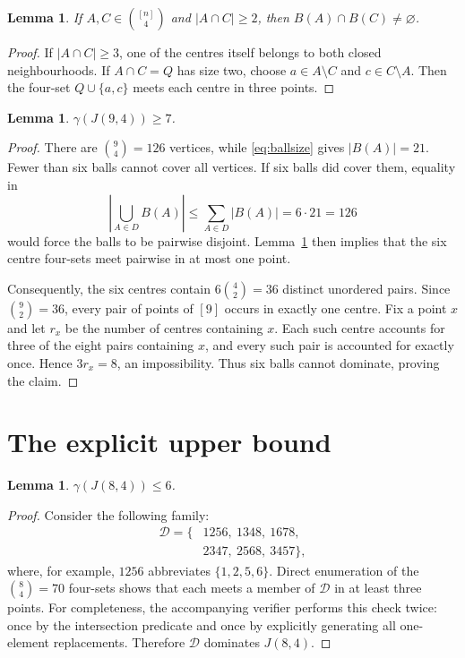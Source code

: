 \documentclass[11pt]{amsart}
\newtheorem{lemma}[theorem]{Lemma}
\begin{document}
\begin{lemma}\label{lem:intersection}
If $A,C\in\binom{[n]}4$ and $|A\cap C|\ge2$, then
$B(A)\cap B(C)\ne\varnothing$.
\end{lemma}
\begin{proof}
If $|A\cap C|\ge3$, one of the centres itself belongs to both closed
neighbourhoods.  If $A\cap C=Q$ has size two, choose
$a\in A\setminus C$ and $c\in C\setminus A$.  Then the four-set
$Q\cup\{a,c\}$ meets each centre in three points.
\end{proof}

\begin{lemma}\label{lem:lower}
$\gamma(J(9,4))\ge7$.
\end{lemma}
\begin{proof}
There are $\binom94=126$ vertices, while \eqref{eq:ballsize} gives
$|B(A)|=21$.  Fewer than six balls cannot cover all vertices.  If six balls
did cover them, equality in
\[
 \left|\bigcup_{A\in D}B(A)\right|\le\sum_{A\in D}|B(A)|=6\cdot21=126
\]
would force the balls to be pairwise disjoint.  Lemma~\ref{lem:intersection}
then implies that the six centre four-sets meet pairwise in at most one point.

Consequently, the six centres contain $6\binom42=36$ distinct unordered
pairs.  Since $\binom92=36$, every pair of points of $[9]$ occurs in exactly
one centre.  Fix a point $x$ and let $r_x$ be the number of centres containing
$x$.  Each such centre accounts for three of the eight pairs containing $x$,
and every such pair is accounted for exactly once.  Hence $3r_x=8$, an
impossibility.  Thus six balls cannot dominate, proving the claim.
\end{proof}

\section{The explicit upper bound}
\begin{lemma}\label{lem:upper}
$\gamma(J(8,4))\le6$.
\end{lemma}
\begin{proof}
Consider the following family:
\begin{align*}
\mathcal D=\{&1256,\ 1348,\ 1678,\\
             &2347,\ 2568,\ 3457\},
\end{align*}
where, for example, $1256$ abbreviates $\{1,2,5,6\}$.  Direct enumeration of
the $\binom84=70$ four-sets shows that each meets a member of $\mathcal D$ in
at least three points.  For completeness, the accompanying verifier performs
this check twice: once by the intersection predicate and once by explicitly
generating all one-element replacements.  Therefore $\mathcal D$ dominates
$J(8,4)$.
\end{proof}
\end{document}
